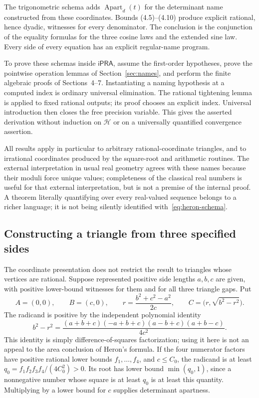 \documentclass[11pt,a4paper]{article}
\theoremstyle{definition}
\newcommand{\ipra}{\mathsf{iPRA}}
\newcommand{\Apart}{\operatorname{Apart}}
\numberwithin{equation}{section}
\begin{document}
The trigonometric schema adds \(\Apart_d(t)\) for the determinant
name constructed from these coordinates. Bounds (4.5)--(4.10)
produce explicit rational, hence dyadic, witnesses for every
denominator. The conclusion is the conjunction of the equality
formulas for the three cosine laws and the extended sine law.
Every side of every equation has an explicit regular-name program.

To prove these schemas inside \(\ipra\), assume the first-order
hypotheses, prove the pointwise operation lemmas of
Section~\ref{sec:names}, and perform the finite algebraic proofs of
Sections~4--7. Instantiating a naming hypothesis at a computed
index is ordinary universal elimination. The rational tightening
lemma is applied to fixed rational outputs; its proof chooses an
explicit index. Universal introduction then closes the free
precision variable. This gives the asserted derivation without
induction on \(\mathcal H\) or on a universally quantified
convergence assertion.

All results apply in particular to arbitrary rational-coordinate
triangles, and to irrational coordinates produced by the square-root
and arithmetic routines. The external interpretation in usual real
geometry agrees with these names because their moduli force unique
values; completeness of the classical real numbers is useful for
that external interpretation, but is not a premise of the internal
proof. A theorem literally quantifying over every real-valued
sequence belongs to a richer language; it is not being silently
identified with~\eqref{eq:heron-schema}.

\subsection{Constructing a triangle from three specified sides}

The coordinate presentation does not restrict the result to
triangles whose vertices are rational. Suppose represented positive
side lengths \(a,b,c\) are given, with positive lower-bound witnesses
for them and for all three triangle gaps. Put
\[
 A=(0,0),\qquad B=(c,0),\qquad
 r=\frac{b^2+c^2-a^2}{2c},\qquad
 C=\bigl(r,\sqrt{b^2-r^2}\bigr).
 \tag{9.2}\label{eq:side-construction}
\]
The radicand is positive by the independent polynomial identity
\[
 b^2-r^2=
 \frac{(a+b+c)(-a+b+c)(a-b+c)(a+b-c)}{4c^2}.
 \tag{9.3}
\]
This identity is simply difference-of-squares factorization; using
it here is not an appeal to the area conclusion of Heron's formula.
If the four numerator factors have positive rational lower
bounds \(f_1,\ldots,f_4\), and \(c\le C_0\), the radicand is at
least \(q_0=f_1f_2f_3f_4/(4C_0^2)>0\).
Its root has lower bound \(\min(q_0,1)\), since a nonnegative
number whose square is at least \(q_0\) is at least this quantity.
Multiplying by a lower bound for \(c\) supplies determinant apartness.
\end{document}
